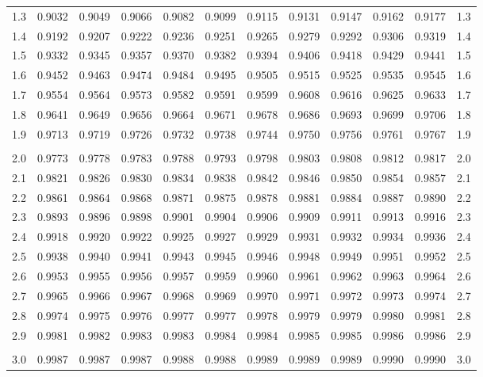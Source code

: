 \documentclass[12pt]{article}
\begin{document}
\begin{landscape}
\begin{adjustbox}{angle=270}
\begin{tabular}{r@{\hspace{4.5mm}}
	*5{c @{\hspace{2.5mm}}}@{\hspace{-0.5mm}}*5{@{\hspace{2.5mm}}c}@{\hspace{2mm}}r}
1.3 & 0.9032 & 0.9049 & 0.9066 & 0.9082 & 0.9099 & 0.9115 & 0.9131 & 0.9147 & 0.9162 & 0.9177 & 1.3 \\
1.4 & 0.9192 & 0.9207 & 0.9222 & 0.9236 & 0.9251 & 0.9265 & 0.9279 & 0.9292 & 0.9306 & 0.9319 & 1.4 \\
1.5 & 0.9332 & 0.9345 & 0.9357 & 0.9370 & 0.9382 & 0.9394 & 0.9406 & 0.9418 & 0.9429 & 0.9441 & 1.5 \\
1.6 & 0.9452 & 0.9463 & 0.9474 & 0.9484 & 0.9495 & 0.9505 & 0.9515 & 0.9525 & 0.9535 & 0.9545 & 1.6 \\
1.7 & 0.9554 & 0.9564 & 0.9573 & 0.9582 & 0.9591 & 0.9599 & 0.9608 & 0.9616 & 0.9625 & 0.9633 & 1.7 \\
1.8 & 0.9641 & 0.9649 & 0.9656 & 0.9664 & 0.9671 & 0.9678 & 0.9686 & 0.9693 & 0.9699 & 0.9706 & 1.8 \\
1.9 & 0.9713 & 0.9719 & 0.9726 & 0.9732 & 0.9738 & 0.9744 & 0.9750 & 0.9756 & 0.9761 & 0.9767 & 1.9 \\
&&&&&&&&&&{} \\
2.0 & 0.9773 & 0.9778 & 0.9783 & 0.9788 & 0.9793 & 0.9798 & 0.9803 & 0.9808 & 0.9812 & 0.9817 & 2.0 \\
2.1 & 0.9821 & 0.9826 & 0.9830 & 0.9834 & 0.9838 & 0.9842 & 0.9846 & 0.9850 & 0.9854 & 0.9857 & 2.1 \\
2.2 & 0.9861 & 0.9864 & 0.9868 & 0.9871 & 0.9875 & 0.9878 & 0.9881 & 0.9884 & 0.9887 & 0.9890 & 2.2 \\
2.3 & 0.9893 & 0.9896 & 0.9898 & 0.9901 & 0.9904 & 0.9906 & 0.9909 & 0.9911 & 0.9913 & 0.9916 & 2.3 \\
2.4 & 0.9918 & 0.9920 & 0.9922 & 0.9925 & 0.9927 & 0.9929 & 0.9931 & 0.9932 & 0.9934 & 0.9936 & 2.4 \\
2.5 & 0.9938 & 0.9940 & 0.9941 & 0.9943 & 0.9945 & 0.9946 & 0.9948 & 0.9949 & 0.9951 & 0.9952 & 2.5 \\
2.6 & 0.9953 & 0.9955 & 0.9956 & 0.9957 & 0.9959 & 0.9960 & 0.9961 & 0.9962 & 0.9963 & 0.9964 & 2.6 \\
2.7 & 0.9965 & 0.9966 & 0.9967 & 0.9968 & 0.9969 & 0.9970 & 0.9971 & 0.9972 & 0.9973 & 0.9974 & 2.7 \\
2.8 & 0.9974 & 0.9975 & 0.9976 & 0.9977 & 0.9977 & 0.9978 & 0.9979 & 0.9979 & 0.9980 & 0.9981 & 2.8 \\
2.9 & 0.9981 & 0.9982 & 0.9983 & 0.9983 & 0.9984 & 0.9984 & 0.9985 & 0.9985 & 0.9986 & 0.9986 & 2.9 \\
&&&&&&&&&&{} \\
3.0 & 0.9987 & 0.9987 & 0.9987 & 0.9988 & 0.9988 & 0.9989 & 0.9989 & 0.9989 & 0.9990 & 0.9990 & 3.0 \\

\end{tabular}
\end{adjustbox}
\end{landscape}
\end{document}
